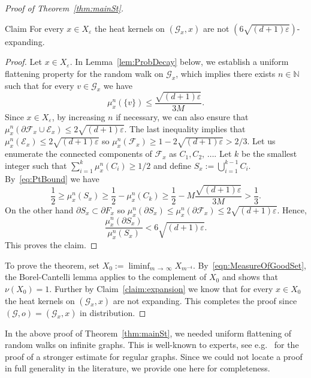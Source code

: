 \documentclass[10pt]{amsart}
\theoremstyle{definition}\newtheorem{defi}[theo]{Definition}\newtheorem{rema}[theo]{Remark}\newtheorem{exam}[theo]{Example}\newtheorem{exem}[theo]{Example}\newtheorem{nota}[theo]{Notation}
\newcommand{\bbN}{\mathbb{N}}
\newcommand{\calE}{\mathcal{E}}
\newcommand{\calF}{\mathcal{F}}
\newcommand{\calG}{\mathcal{G}}
\begin{document}
\begin{proof}[{Proof of Theorem~\ref{thm:mainSt}}]
\begin{enonce}[plain]{Claim}\label{claim:expansion}
For every $x\in X_\varepsilon$ the heat kernels on $(\calG_x,x)$ are not $(6\sqrt{(d+1)\varepsilon})$-expanding.
\end{enonce}

\begin{proof}
Let $x\in X_\varepsilon$. In Lemma~\ref{lem:ProbDecay} below, we establish a uniform flattening property for the random walk on $\calG_x$, which implies there exists $n\in\bbN$ such that for every $v\in \calG_x$ we have
\begin{equation}\label{eq:PtBound}
\mu_x^n(\{v\})\leq \frac{\sqrt{(d+1)\varepsilon}}{3M}.
\end{equation}
Since $x\in X_\varepsilon$, by increasing $n$ if necessary, we can also ensure that $\mu_x^n(\partial \calF_x\cup \calE_x)\leq 2{\sqrt{(d+1)\varepsilon}}$. The last inequality implies that $\mu_x^n(\calE_x)\leq 2{\sqrt{(d+1)\varepsilon}}$ so $\mu_x^n(\calF_x)\geq 1- 2{\sqrt{(d+1)\varepsilon}}>2/3$. Let us enumerate the connected components of $\calF_x$ as $C_1,C_2,\,\ldots.$ Let $k$ be the smallest integer such that $\sum_{i=1}^k \mu_x^n(C_i)\geq 1/2$ and define $S_x:=\bigcup_{i=1}^{k-1} C_i$. By~\eqref{eq:PtBound} we have
\[
\frac{1}{2}\geq \mu_x^n(S_x)\geq \frac{1}{2}-\mu_x^n(C_k)\geq \frac{1}{2} -M\frac{\sqrt{(d+1)\varepsilon}}{3M}> \frac{1}{3}.
\]
On the other hand $\partial S_x\subset \partial F_x$ so $\mu^n_x(\partial S_x)\leq \mu^n_x(\partial \calF_x)\leq 2\sqrt{(d+1)\varepsilon}.$ Hence,
\[
\frac{\mu_x^n(\partial S_x)}{\mu_x^n(S_x)}<6\sqrt{(d+1)\varepsilon}.
\]
This proves the claim.
\end{proof}

To prove the theorem, set $X_0:=\liminf_{m\,\to\,\infty} X_{m^{-4}}$. By~\eqref{eqn:MeasureOfGoodSet}, the Borel-Cantelli lemma applies to the complement of $X_0$ and shows that $\nu(X_0)=1$. Further by Claim~\ref{claim:expansion} we know that for every $x\in X_0$ the heat kernels on $(\calG_x,x)$ are not expanding. This completes the proof since $(\calG,o)=(\calG_x,x)$ in distribution.
\end{proof}

In the above proof of Theorem~\ref{thm:mainSt}, we needed uniform flattening of random walks on infinite graphs. This is well-known to experts, see e.g.~\cite[Lemma~3.2]{PeteTimar} for the proof of a stronger estimate for regular graphs. Since we could not locate a proof in full generality in the literature, we provide one here for completeness.
\end{document}
